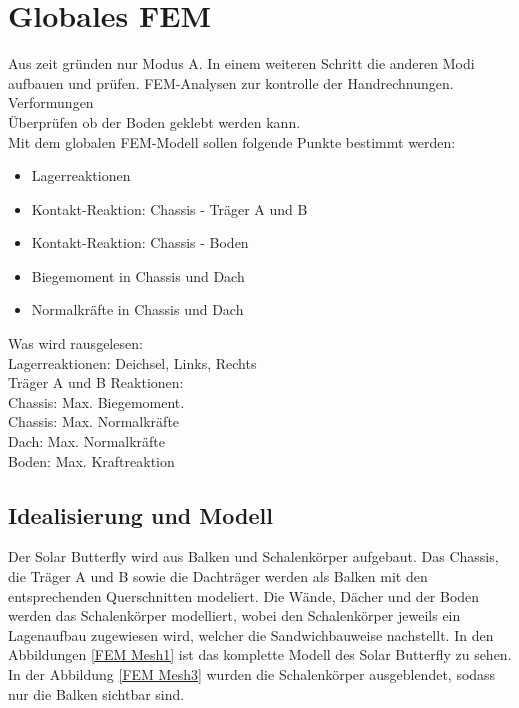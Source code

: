 \section{Globales FEM}

Aus zeit gründen nur Modus A. In einem weiteren Schritt die anderen Modi aufbauen und prüfen.
FEM-Analysen zur kontrolle der Handrechnungen.\\
Verformungen\\
Überprüfen ob der Boden geklebt werden kann.\\

Mit dem globalen FEM-Modell sollen folgende Punkte bestimmt werden:
\begin{itemize}
  \item Lagerreaktionen
  \item Kontakt-Reaktion: Chassis - Träger A und B
  \item Kontakt-Reaktion: Chassis - Boden
  \item Biegemoment in Chassis und Dach
  \item Normalkräfte in Chassis und Dach
\end{itemize}

Was wird rausgelesen:\\
Lagerreaktionen: Deichsel, Links, Rechts\\
Träger A und B Reaktionen:\\
Chassis: Max. Biegemoment.\\
Chassis: Max. Normalkräfte\\
Dach: Max. Normalkräfte\\
Boden: Max. Kraftreaktion\\


\subsection{Idealisierung und Modell}
Der Solar Butterfly wird aus Balken und Schalenkörper aufgebaut. Das Chassis, die Träger A und B sowie die Dachträger werden als Balken mit den entsprechenden Querschnitten modeliert. Die Wände, Dächer und der Boden werden das Schalenkörper modelliert, wobei den Schalenkörper jeweils ein Lagenaufbau zugewiesen wird, welcher die Sandwichbauweise nachstellt. In den Abbildungen \ref{FEM Mesh1} ist das komplette Modell des Solar Butterfly zu sehen. In der Abbildung \ref{FEM Mesh3} wurden die Schalenkörper ausgeblendet, sodass nur die Balken sichtbar sind.

